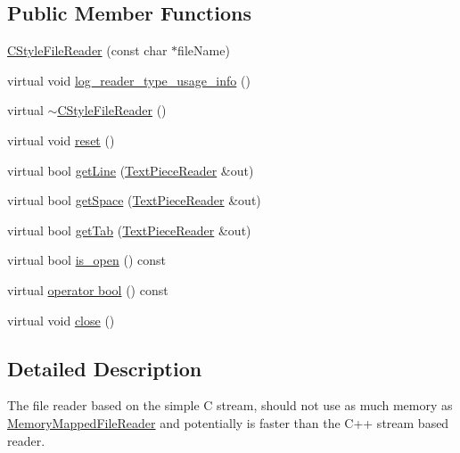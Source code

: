 \subsection*{Public Member Functions}
\begin{DoxyCompactItemize}
\item 
\hyperlink{classuva_1_1smt_1_1file_1_1_c_style_file_reader_adb6db586672f56a28a3246a5c045f1d8}{C\+Style\+File\+Reader} (const char $\ast$file\+Name)
\item 
virtual void \hyperlink{classuva_1_1smt_1_1file_1_1_c_style_file_reader_a7844cf167a20c831704aa11bee03f259}{log\+\_\+reader\+\_\+type\+\_\+usage\+\_\+info} ()
\item 
virtual \hyperlink{classuva_1_1smt_1_1file_1_1_c_style_file_reader_a0ea17d8e21b7c0e5c7dca4f04396d393}{$\sim$\+C\+Style\+File\+Reader} ()
\item 
virtual void \hyperlink{classuva_1_1smt_1_1file_1_1_c_style_file_reader_ab0719f5d5016f264151f365cb7239204}{reset} ()
\item 
virtual bool \hyperlink{classuva_1_1smt_1_1file_1_1_c_style_file_reader_a08c79dc1e45c78ebe32f22d60f853107}{get\+Line} (\hyperlink{classuva_1_1smt_1_1file_1_1_text_piece_reader}{Text\+Piece\+Reader} \&out)
\item 
virtual bool \hyperlink{classuva_1_1smt_1_1file_1_1_c_style_file_reader_adc3174fe9ac1db814ac53f0a55e6e4cf}{get\+Space} (\hyperlink{classuva_1_1smt_1_1file_1_1_text_piece_reader}{Text\+Piece\+Reader} \&out)
\item 
virtual bool \hyperlink{classuva_1_1smt_1_1file_1_1_c_style_file_reader_a62dceeef9dcda302693a456f33a036c0}{get\+Tab} (\hyperlink{classuva_1_1smt_1_1file_1_1_text_piece_reader}{Text\+Piece\+Reader} \&out)
\item 
virtual bool \hyperlink{classuva_1_1smt_1_1file_1_1_c_style_file_reader_a6a109b1f72675c842d8dd0be14dbf1bf}{is\+\_\+open} () const 
\item 
virtual \hyperlink{classuva_1_1smt_1_1file_1_1_c_style_file_reader_aaf16f8bd5b18aaa44a6b838d96a5e47e}{operator bool} () const 
\item 
virtual void \hyperlink{classuva_1_1smt_1_1file_1_1_c_style_file_reader_a874cd40683ed83b7c86eecf7fa9d8dfd}{close} ()
\end{DoxyCompactItemize}


\subsection{Detailed Description}
The file reader based on the simple C stream, should not use as much memory as \hyperlink{classuva_1_1smt_1_1file_1_1_memory_mapped_file_reader}{Memory\+Mapped\+File\+Reader} and potentially is faster than the C++ stream based reader. 

